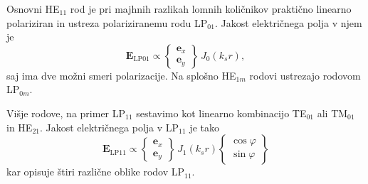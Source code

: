 Osnovni HE$_{11}$ rod je pri majhnih razlikah lomnih količnikov praktično linearno polariziran in ustreza polariziranemu rodu LP$_{01}$. Jakost električnega polja v njem je 
\begin{equation}
\mathbf{E}_\mathrm{LP01} \propto 
\left \{
  \begin{matrix}
  \mathbf{e}_x \\ \mathbf{e}_y 
  \end{matrix}
\right \} \, J_0(k_s r),
\end{equation}
saj ima dve možni smeri polarizacije. Na splošno HE$_{1m}$ rodovi ustrezajo rodovom LP$_{0m}$. 

Višje rodove, na primer LP$_{11}$ sestavimo kot linearno kombinacijo 
TE$_{01}$ ali TM$_{01}$ in HE$_{21}$.
Jakost električnega polja v LP$_{11}$ je tako 
\begin{equation}
\mathbf{E}_\mathrm{LP11} \propto \left \{
  \begin{matrix}
  \mathbf{e}_x \\ \mathbf{e}_y 
  \end{matrix}
\right \} \, J_1(k_s r)
\left \{
  \begin{matrix}
  \cos\varphi  \\ \sin\varphi 
  \end{matrix}
\right \}
\end{equation}
kar opisuje štiri različne oblike rodov LP$_{11}$.

